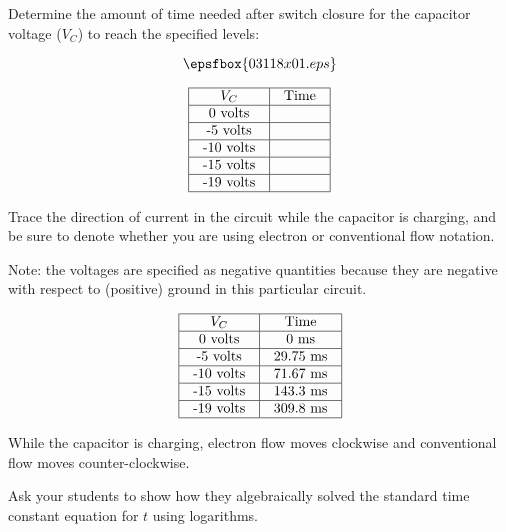 

Determine the amount of time needed after switch closure for the capacitor voltage ($V_C$) to reach the specified levels:

$$\epsfbox{03118x01.eps}$$


$$\vbox{\offinterlineskip
\halign{\strut
\vrule \quad\hfil # \ \hfil & 
\vrule \quad\hfil # \ \hfil \vrule \cr
\noalign{\hrule}
%
$V_C$ & Time  \cr
%
\noalign{\hrule}
%
0 volts &  \cr
%
\noalign{\hrule}
%
-5 volts &  \cr
%
\noalign{\hrule}
%
-10 volts &  \cr
%
\noalign{\hrule}
%
-15 volts &  \cr
%
\noalign{\hrule}
%
-19 volts &  \cr
%
\noalign{\hrule}
} %
}$$ %

Trace the direction of current in the circuit while the capacitor is charging, and be sure to denote whether you are using electron or conventional flow notation.

\vskip 10pt

Note: the voltages are specified as negative quantities because they are negative with respect to (positive) ground in this particular circuit.








$$\vbox{\offinterlineskip
\halign{\strut
\vrule \quad\hfil # \ \hfil & 
\vrule \quad\hfil # \ \hfil \vrule \cr
\noalign{\hrule}
%
$V_C$ & Time  \cr
%
\noalign{\hrule}
%
0 volts & 0 ms \cr
%
\noalign{\hrule}
%
-5 volts & 29.75 ms \cr
%
\noalign{\hrule}
%
-10 volts & 71.67 ms \cr
%
\noalign{\hrule}
%
-15 volts & 143.3 ms \cr
%
\noalign{\hrule}
%
-19 volts & 309.8 ms \cr
%
\noalign{\hrule}
} %
}$$ %

While the capacitor is charging, electron flow moves clockwise and conventional flow moves counter-clockwise.







Ask your students to show how they algebraically solved the standard time constant equation for $t$ using logarithms.




